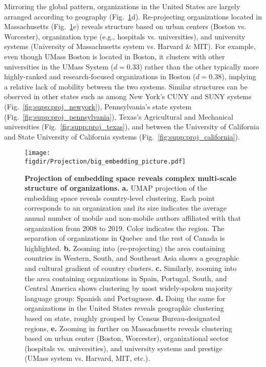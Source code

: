 \documentclass[12pt]{article} %
\def\figdir{../Figs}
\begin{document}
Mirroring the global pattern, organizations in the United States are largely arranged according to geography (Fig.~\ref{fig:projection}d).
Re-projecting organizations located in Massachusetts (Fig.~\ref{fig:projection}e) reveals structure based on urban centers (Boston vs. Worcester), organization type (e.g., hospitals vs. universities), and university systems (University of  Massachusetts system vs. Harvard \& MIT).
For example, even though UMass Boston is located in Boston, it clusters with other universities in the UMass System ($d = 0.33$) rather than the other typically more highly-ranked and research-focused organizations in Boston ($d = 0.38$), implying a relative lack of mobility between the two systems.
Similar structures can be observed in other states such as among New York's CUNY and SUNY systems (Fig.~\ref{fig:supp:proj_newyork}), Pennsylvania's state system (Fig.~\ref{fig:supp:proj_pennsylvania}), Texas's Agricultural and Mechanical universities (Fig.~\ref{fig:supp:proj_texas}), and between the University of California and State University of California systems (Fig.~\ref{fig:supp:proj_california}).


%
%
\begin{figure}[hp!]
	\centering
	\texttt{[image: \\figdir/Projection/big\_embedding\_picture.pdf]}
	\caption{
		\textbf{Projection of embedding space reveals complex multi-scale structure of organizations.}
		\textbf{a.}
		UMAP projection \autocite{mcinnes2018umap} of the embedding space reveals country-level clustering.
		Each point corresponds to an organization and its size indicates the average annual number of mobile and non-mobile authors affiliated with that organization from 2008 to 2019.
		Color indicates the region.
		The separation of organizations in Quebec and the rest of Canada is highlighted.
		\textbf{b.} Zooming into (re-projecting) the area containing countries in Western, South, and Southeast Asia shows a geographic and cultural gradient of country clusters.
		\textbf{c.} Similarly, zooming into the area containing organizations in Spain, Portugal, South, and Central America shows clustering by most widely-spoken majority language group: Spanish and Portuguese.
		\textbf{d.} Doing the same for organizations in the United States reveals geographic clustering based on state, roughly grouped by Census Bureau-designated regions,
		\textbf{e.} Zooming in further on Massachusetts reveals clustering based on urban center (Boston, Worcester), organizational sector (hospitals vs. universities), and university systems and prestige (UMass system vs. Harvard, MIT, etc.).
	}
	\label{fig:projection}
\end{figure}
\end{document}
